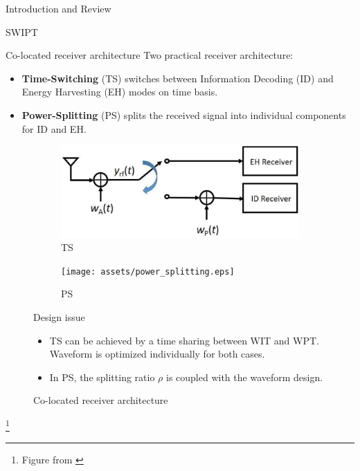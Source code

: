 \documentclass[9pt]{beamer}
\newcommand\blfootnote[1]{%
\begingroup
\renewcommand\thefootnote{}\footnote{#1}%
\addtocounter{footnote}{-1}%
\endgroup
}
\begin{document}
\begin{section}{Introduction and Review}
\begin{subsection}{SWIPT}
		\begin{frame}{Co-located receiver architecture}
			Two practical receiver architecture:
			\begin{itemize}
				\item \textbf{Time-Switching} (TS) switches between Information Decoding (ID) and Energy Harvesting (EH) modes on time basis.
				\item \textbf{Power-Splitting} (PS) splits the received signal into individual components for ID and EH.
			\end{itemize}
			\begin{figure}
				\centering
				\begin{subfigure}{0.48\textwidth}
					\centering
					\includegraphics[width=0.8\linewidth]{assets/time_switching.eps}
					\caption{TS}
				\end{subfigure}%
				\begin{subfigure}{0.48\textwidth}
					\centering
					\texttt{[image: assets/power\_splitting.eps]}
					\caption{PS}
				\end{subfigure}
				\caption{Co-located receiver architecture}
				\begin{block}{Design issue}
					\begin{itemize}
						\item TS can be achieved by a time sharing between WIT and WPT. Waveform is optimized individually for both cases.
						\item In PS, the splitting ratio $\rho$ is coupled with the waveform design.
					\end{itemize}
				\end{block}
			\end{figure}
			\blfootnote{Figure from \cite{Clerckx2019}}
		\end{frame}


\end{subsection}
\end{section}
\end{document}
